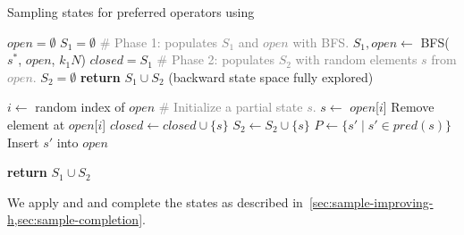 \documentclass[ppgc,diss,english]{iiufrgs}
\begin{document}
\begin{algorithm}[tb]
\caption{Sampling states for preferred operators using \bfsrs}
\label{alg:sampling-po}
\begin{algorithmic}[1]
  \State $open = \emptyset$
  \State $S_{1} = \emptyset$
  \State \textcolor{gray}{\# Phase 1: populates $S_{1}$ and $open$ with BFS.}
  \State $S_{1}, open \gets$ BFS($s^{*}$, $open$, $k_1N$)
  \State $closed = S_{1}$
  \State \textcolor{gray}{\# Phase 2: populates $S_{2}$ with random elements $s$ from $open$.}
  \State $S_{2} = \emptyset$
      \State \textbf{return} $S_{1} \cup S_{2}$ (backward state space fully explored)
    \EndIf

    \State $i \gets$ random index of $open$
    \State \textcolor{gray}{\# Initialize a partial state $s$.}
    \State $s \gets$ $open$[$i$]
    \State Remove element at $open$[$i$]
    \State $closed \gets closed \cup \{s\}$
    \State $S_{2} \gets S_{2} \cup \{s\}$
    \State $P \gets \{s' \mid s' \in pred(s)\}$
        \State Insert $s'$ into $open$
      \EndIf
    \EndFor
  \EndWhile

  \State \textbf{return} $S_{1} \cup S_{2}$
\EndProcedure
\end{algorithmic}
\end{algorithm}

%
%

We apply \sai and \sui and complete the states as described in~\cref{sec:sample-improving-h,sec:sample-completion}.
\end{document}
